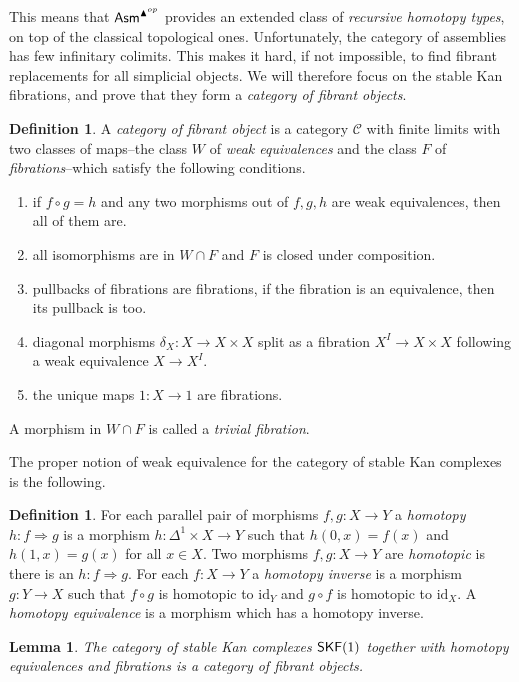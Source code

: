 \documentclass{amsart}
\theoremstyle{plain}
\newtheorem{lemma}[theorem]{Lemma}
\theoremstyle{definition}
\newtheorem{defin}[theorem]{Definition}
\newcommand\cat\mathcal
\newcommand\id{\mathrm{id}}
\begin{document}
This means that $\mathsf{Asm}^{\blacktriangle^{op}}$ provides an extended class of \emph{recursive homotopy types}, on top of the classical topological ones. Unfortunately, the category of assemblies has few infinitary colimits. This makes it hard, if not impossible, to find fibrant replacements for all simplicial objects. We will therefore focus on the stable Kan fibrations, and prove that they form a \emph{category of fibrant objects}.

\begin{defin} A \emph{category of fibrant object} is a category $\cat C$ with finite limits with two classes of maps--the class $W$ of \emph{weak equivalences} and the class $F$ of \emph{fibrations}--which satisfy the following conditions.
\begin{enumerate}
\item if $f\circ g = h$ and any two morphisms out of $f,g,h$ are weak equivalences, then all of them are.
\item all isomorphisms are in $W\cap F$ and $F$ is closed under composition.
\item pullbacks of fibrations are fibrations, if the fibration is an equivalence, then its pullback is too.
\item diagonal morphisms $\delta_X:X\to X\times X$ split as a fibration $X^I\to X\times X$ following a weak equivalence $X\to X^I$.
\item the unique maps $1:X\to 1$ are fibrations.
\end{enumerate}
A morphism in $W\cap F$ is called a \emph{trivial fibration}.
\label{catoffib}
\end{defin}

The proper notion of weak equivalence for the category of stable Kan complexes is the following.

\newcommand\hto\Rightarrow
\begin{defin} For each parallel pair of morphisms $f,g:X\to Y$ a \emph{homotopy} $h:f\hto g$ is a morphism $h:\Delta^1\times X\to Y$ such that $h(0,x) = f(x)$ and $h(1,x) = g(x)$ for all $x\in X$. Two morphisms $f,g:X\to Y$ are \emph{homotopic} is there is an $h:f\hto g$. For each $f:X\to Y$ a \emph{homotopy inverse} is a morphism $g:Y\to X$ such that $f\circ g$ is homotopic to $\id_Y$ and $g\circ f$ is homotopic to $\id_X$. A \emph{homotopy equivalence} is a morphism which has a homotopy inverse. \end{defin}

\begin{lemma} The category of stable Kan complexes $\mathsf{SKF}(1)$ together with homotopy equivalences and fibrations is a category of fibrant objects. \end{lemma}
\end{document}
